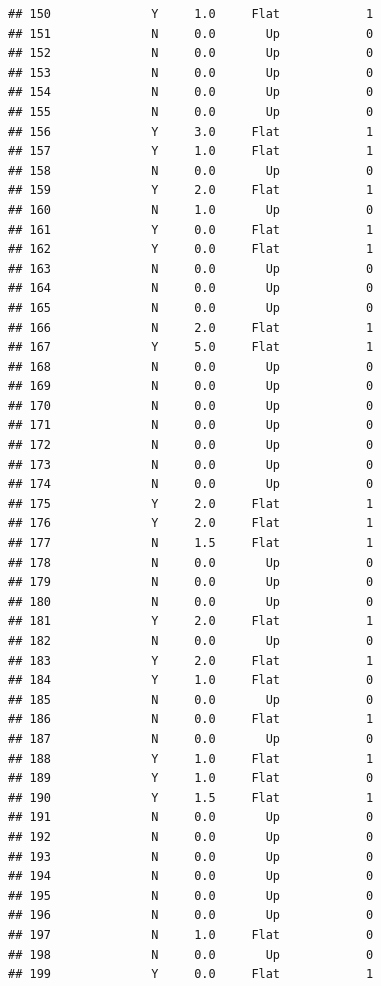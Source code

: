 \documentclass[
]{article}
\begin{document}
\begin{verbatim}
## 150              Y     1.0     Flat            1
## 151              N     0.0       Up            0
## 152              N     0.0       Up            0
## 153              N     0.0       Up            0
## 154              N     0.0       Up            0
## 155              N     0.0       Up            0
## 156              Y     3.0     Flat            1
## 157              Y     1.0     Flat            1
## 158              N     0.0       Up            0
## 159              Y     2.0     Flat            1
## 160              N     1.0       Up            0
## 161              Y     0.0     Flat            1
## 162              Y     0.0     Flat            1
## 163              N     0.0       Up            0
## 164              N     0.0       Up            0
## 165              N     0.0       Up            0
## 166              N     2.0     Flat            1
## 167              Y     5.0     Flat            1
## 168              N     0.0       Up            0
## 169              N     0.0       Up            0
## 170              N     0.0       Up            0
## 171              N     0.0       Up            0
## 172              N     0.0       Up            0
## 173              N     0.0       Up            0
## 174              N     0.0       Up            0
## 175              Y     2.0     Flat            1
## 176              Y     2.0     Flat            1
## 177              N     1.5     Flat            1
## 178              N     0.0       Up            0
## 179              N     0.0       Up            0
## 180              N     0.0       Up            0
## 181              Y     2.0     Flat            1
## 182              N     0.0       Up            0
## 183              Y     2.0     Flat            1
## 184              Y     1.0     Flat            0
## 185              N     0.0       Up            0
## 186              N     0.0     Flat            1
## 187              N     0.0       Up            0
## 188              Y     1.0     Flat            1
## 189              Y     1.0     Flat            0
## 190              Y     1.5     Flat            1
## 191              N     0.0       Up            0
## 192              N     0.0       Up            0
## 193              N     0.0       Up            0
## 194              N     0.0       Up            0
## 195              N     0.0       Up            0
## 196              N     0.0       Up            0
## 197              N     1.0     Flat            0
## 198              N     0.0       Up            0
## 199              Y     0.0     Flat            1

\end{verbatim}
\end{document}
